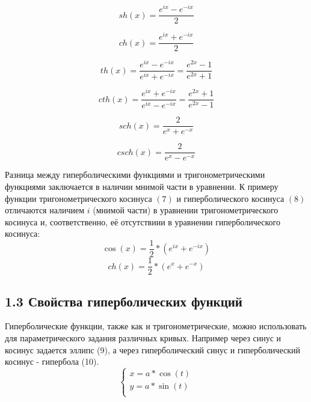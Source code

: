 \begin{equation}
    sh(x)=\frac{e^{ix}-e^{-ix}}{2}
 \end{equation}
 
 \begin{equation}
    ch(x)=\frac{e^{ix}+e^{-ix}}{2}
 \end{equation}
 
 \begin{equation}
    th(x)=\frac{e^{ix}-e^{-ix}}{e^{ix}+e^{-ix}}=\frac{e^{2x}-1}{e^{2x}+1}
 \end{equation}
 
 \begin{equation}
    cth(x)=\frac{e^{ix}+e^{-ix}}{e^{ix}-e^{-ix}}=\frac{e^{2x}+1}{e^{2x}-1}
 \end{equation}
 
 \begin{equation}
    sch(x)=\frac{2}{e^{x}+e^{-x}}
 \end{equation}
 
 \begin{equation}
    csch(x)=\frac{2}{e^{x}-e^{-x}}
 \end{equation}
 
Разница между гиперболическими функциями и тригонометрическими функциями заключается в наличии мнимой части в уравнении. 
К примеру функции тригонометрического косинуса $(7)$ и гиперболического косинуса $(8)$ отличаются наличием $i$ (мнимой части) в уравнении тригонометрического косинуса и, соответственно, её отсутствиии в уравнении гиперболического косинуса:\\
 \begin{equation}
    \cos(x)=\frac{1}{2}*(e^{ix}+e^{-ix})
 \end{equation}
 \begin{equation}
    ch(x)=\frac{1}{2}*(e^{x}+e^{-x})
\end{equation}

\subsection*{1.3 Свойства гиперболических функций}
Гиперболические функции, также как и тригонометрические, можно использовать для параметрического задания различных кривых. Например через синус и косинус задается эллипс (9), а через гиперболический синус и гиперболический косинус - гипербола (10).
\begin{equation}
    \begin{cases}
        x = a * \cos(t)\\
        y = a * \sin(t)\\
    \end{cases}
\end{equation}

